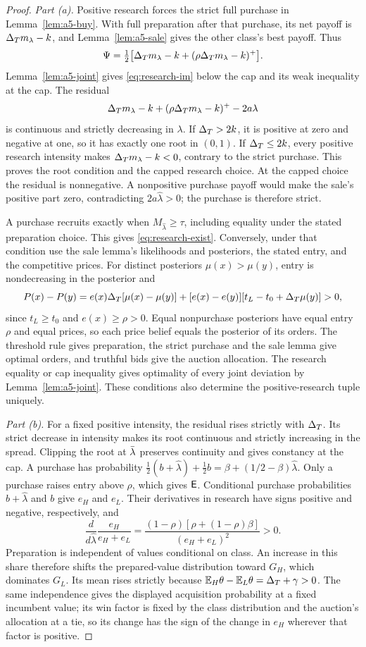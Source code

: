 \begin{proof}
\emph{Part (a).} Positive research forces the strict full purchase in Lemma~\ref{lem:a5-buy}.
With full preparation after that purchase, its net payoff is \(\Delta_T m_\lambda-k\), and
Lemma~\ref{lem:a5-sale} gives the other class's best payoff. Thus
\[
 \Psi=\tfrac12\bigl[\Delta_T m_\lambda-k+(\rho\Delta_T m_\lambda-k)^+\bigr].
\]
Lemma~\ref{lem:a5-joint} gives \eqref{eq:research-im} below the cap and its weak inequality at the cap.
The residual
\[
 \Delta_T m_\lambda-k+(\rho\Delta_T m_\lambda-k)^+-2a\lambda
\]
is continuous and strictly decreasing in \(\lambda\). If \(\Delta_T>2k\), it is positive at zero and negative at
one, so it has exactly one root in \((0,1)\). If \(\Delta_T\le2k\), every positive research intensity makes
\(\Delta_T m_\lambda-k<0\), contrary to the strict purchase. This proves the root condition and the capped
research choice. At the capped choice the residual is nonnegative. A nonpositive purchase payoff would make
the sale's positive part zero, contradicting \(2a\hat\lambda>0\); the purchase is therefore strict.

A purchase recruits exactly when \(M_{\hat\lambda}\ge\tau\), including equality under the stated preparation
choice. This gives \eqref{eq:research-exist}. Conversely, under that condition use the sale lemma's
likelihoods and posteriors, the stated entry, and the competitive prices. For distinct posteriors
\(\mu(x)>\mu(y)\), entry is nondecreasing in the posterior and
\[
 P(x)-P(y)=e(x)\Delta_T[\mu(x)-\mu(y)]
 +[e(x)-e(y)][t_L-t_0+\Delta_T\mu(y)]>0,
\]
since \(t_L\ge t_0\) and \(e(x)\ge\rho>0\). Equal nonpurchase posteriors have equal entry \(\rho\)
and equal prices, so each price belief equals the posterior of its orders. The threshold rule gives
preparation, the strict purchase and the sale lemma give optimal orders, and truthful bids give the auction
allocation. The research equality or cap inequality gives optimality of every joint deviation by
Lemma~\ref{lem:a5-joint}. These conditions also determine the positive-research tuple uniquely.

\emph{Part (b).} For a fixed positive intensity, the residual rises strictly with \(\Delta_T\).
Its strict decrease in intensity makes its root continuous and strictly increasing in the spread.
Clipping the root at \(\bar\lambda\) preserves continuity and gives constancy at the cap.
A purchase has probability
\(\tfrac12(b+\hat\lambda)+\tfrac12b=\beta+(1/2-\beta)\hat\lambda\).
Only a purchase raises entry above \(\rho\), which gives \(\mathsf{E}\). Conditional purchase probabilities
\(b+\hat\lambda\) and \(b\) give \(e_H\) and \(e_L\). Their derivatives in research have signs
positive and negative, respectively, and
\[
 \frac{d}{d\hat\lambda}\frac{e_H}{e_H+e_L}
 =\frac{(1-\rho)[\rho+(1-\rho)\beta]}{(e_H+e_L)^2}>0.
\]
Preparation is independent of values conditional on class. An increase in this share therefore shifts the
prepared-value distribution toward \(G_H\), which dominates \(G_L\). Its mean rises strictly because
\(\mathbb{E}_H\theta-\mathbb{E}_L\theta=\Delta_T+\gamma>0\).
The same independence gives the displayed acquisition probability at a fixed incumbent value; its win factor
is fixed by the class distribution and the auction's allocation at a tie, so its change has the sign of the change in
\(e_H\) wherever that factor is positive.


\end{proof}
